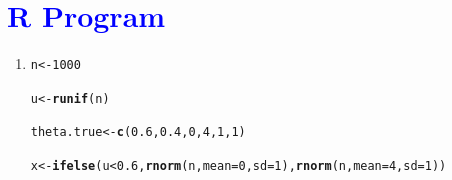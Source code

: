 \documentclass[11pt, a4paper]{article}\usepackage[]{graphicx}\usepackage[]{xcolor}
\makeatletter
\newcommand{\hlnum}[1]{\textcolor[rgb]{0.686,0.059,0.569}{#1}}%
\newcommand{\hlopt}[1]{\textcolor[rgb]{0,0,0}{#1}}%
\newcommand{\hldef}[1]{\textcolor[rgb]{0.345,0.345,0.345}{#1}}%
\newcommand{\hlkwb}[1]{\textcolor[rgb]{0.69,0.353,0.396}{#1}}%
\newcommand{\hlkwc}[1]{\textcolor[rgb]{0.333,0.667,0.333}{#1}}%
\newcommand{\hlkwd}[1]{\textcolor[rgb]{0.737,0.353,0.396}{\textbf{#1}}}%
\newenvironment{kframe}{%
 \def\at@end@of@kframe{}%
 \ifinner\ifhmode%
  \def\at@end@of@kframe{\end{minipage}}%
  \begin{minipage}{\columnwidth}%
 \fi\fi%
 \def\FrameCommand##1{\hskip\@totalleftmargin \hskip-\fboxsep
 \colorbox{shadecolor}{##1}\hskip-\fboxsep
     \hskip-\linewidth \hskip-\@totalleftmargin \hskip\columnwidth}%
 \MakeFramed {\advance\hsize-\width
   \@totalleftmargin\z@ \linewidth\hsize
   \@setminipage}}%
 {\par\unskip\endMakeFramed%
 \at@end@of@kframe}
\newenvironment{knitrout}{}{} %
\makeatother
\begin{document}
\section*{\faArrowAltCircleRight[regular] \textcolor{blue}{R Program}}






\begin{enumerate}

\item[\scalebox{2.0}{\twemoji{keycap: 1}}]

\begin{knitrout}
\color{fgcolor}\begin{kframe}
\begin{alltt}
\hldef{n} \hlkwb{<-} \hlnum{1000}
\end{alltt}
\end{kframe}
\end{knitrout}

\begin{knitrout}
\color{fgcolor}\begin{kframe}
\begin{alltt}
\hldef{u} \hlkwb{<-} \hlkwd{runif}\hldef{(n)}
\end{alltt}
\end{kframe}
\end{knitrout}

\begin{knitrout}
\color{fgcolor}\begin{kframe}
\begin{alltt}
\hldef{theta.true} \hlkwb{<-} \hlkwd{c}\hldef{(}\hlnum{0.6}\hldef{,} \hlnum{0.4}\hldef{,} \hlnum{0}\hldef{,} \hlnum{4}\hldef{,} \hlnum{1}\hldef{,} \hlnum{1}\hldef{)}
\end{alltt}
\end{kframe}
\end{knitrout}

\begin{knitrout}
\color{fgcolor}\begin{kframe}
\begin{alltt}
\hldef{x} \hlkwb{<-} \hlkwd{ifelse}\hldef{(u} \hlopt{<} \hlnum{0.6}\hldef{,} \hlkwd{rnorm}\hldef{(n,} \hlkwc{mean} \hldef{=} \hlnum{0}\hldef{,} \hlkwc{sd} \hldef{=} \hlnum{1}\hldef{),} \hlkwd{rnorm}\hldef{(n,} \hlkwc{mean} \hldef{=} \hlnum{4}\hldef{,} \hlkwc{sd} \hldef{=} \hlnum{1}\hldef{))}
\end{alltt}
\end{kframe}
\end{knitrout}


\end{enumerate}
\end{document}
